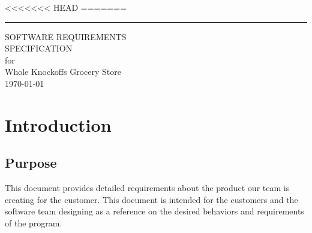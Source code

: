\documentclass{scrreprt}
\date{}
\theoremstyle{funreq}
\def\myversion{1.0 }
\begin{document}
<<<<<<< HEAD
=======

\begin{flushright}
    \rule{16cm}{5pt}\vskip1cm
    \begin{bfseries}
        \Huge{SOFTWARE REQUIREMENTS\\ SPECIFICATION}\\
        \vspace{1.9cm}
        for\\
        \vspace{1.9cm}
        Whole Knockoffs Grocery Store\\
        \vspace{1.9cm}
        \today\\
    \end{bfseries}
\end{flushright}

\tableofcontents


%

\chapter{Introduction}

\section{Purpose}
This document provides detailed requirements about the product our team is creating for the customer.  This document is intended for the customers and the software team designing as a reference on the desired behaviors and requirements of the program.
\end{document}
